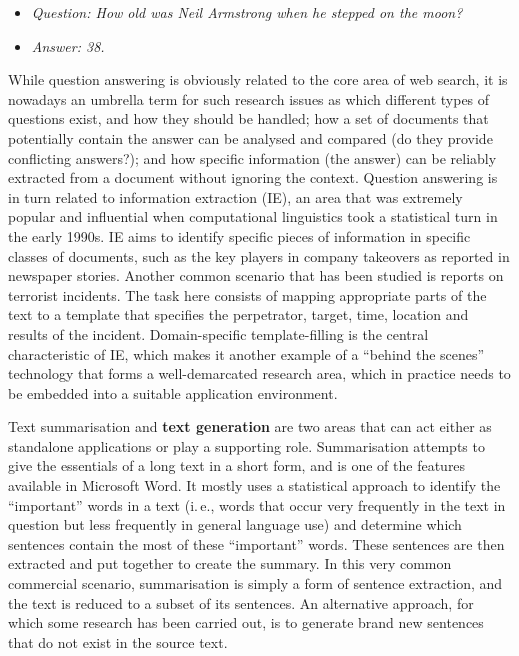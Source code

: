 \begin{multicols}{2}
\begin{itemize}
\item[] \textit{Question: How old was Neil Armstrong when he stepped on the moon?}
\item[] \textit{Answer: 38.}
\end{itemize}

While question answering is obviously related to the core area of web search, it is nowadays an umbrella term for such research issues as which different types of questions exist, and how they should be handled; how a set of documents that potentially contain the answer can be analysed and compared (do they provide conflicting answers?); and how specific information (the answer) can be reliably extracted from a document without ignoring the context. Question answering is in turn related to information extraction (IE), an area that was extremely popular and influential when computational linguistics took a statistical turn in the early 1990s. IE aims to identify specific pieces of information in specific classes of documents, such as the key players in company takeovers as reported in newspaper stories. Another common scenario that has been studied is reports on terrorist incidents. The task here consists of mapping appropriate parts of the text to a template that specifies the perpetrator, target, time, location and results of the incident. Domain-specific template-filling is the central characteristic of IE, which makes it another example of a ``behind the scenes'' technology that forms a well-demarcated research area, which in practice needs to be embedded into a suitable application environment. 


Text summarisation and \textbf{text generation} are two areas that can act either as standalone applications or play a supporting role. Summarisation attempts to give the essentials of a long text in a short form, and is one of the features available in Microsoft Word. It mostly uses a statistical approach to identify the ``important'' words in a text (i.\,e., words that occur very frequently in the text in question but less frequently in general language use) and determine which sentences contain the most of these ``important'' words. These sentences are then extracted and put together to create the summary. In this very common commercial scenario, summarisation is simply a form of sentence extraction, and the text is reduced to a subset of its sentences. An alternative approach, for which some research has been carried out, is to generate brand new sentences that do not exist in the source text. 


\end{multicols}
